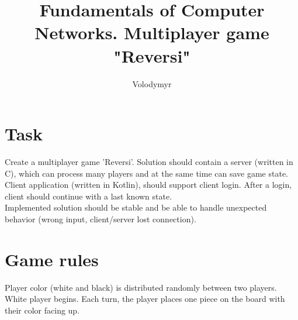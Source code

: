 \documentclass[english, sem, kiv, he, iso690alph, pdf, viewonly]{fasthesis}
\title{Fundamentals of Computer Networks. Multiplayer game "Reversi"}
\author{Volodymyr}{Pavlov}{}{}
\begin{document}
\frontpages[notm] %
\tableofcontents
% 
%
\makeatletter%
\ifx\FASThesis@style\c@fullcolor%
\else%
\fi%
\makeatother%
%
%
%

\chapter{Task}

Create a multiplayer game 'Reversi'. Solution should contain a server (written in C), which can process many players and at the same time can save game state. Client application (written in Kotlin), should support client login. After a login, client should continue with a last known state. \\

Implemented solution should be stable and be able to handle unexpected behavior (wrong input, client/server lost connection).

\chapter{Game rules}

Player color (white and black) is distributed randomly between two players. White player begins. Each turn, the player places one piece on the board with their color facing up.
\end{document}
